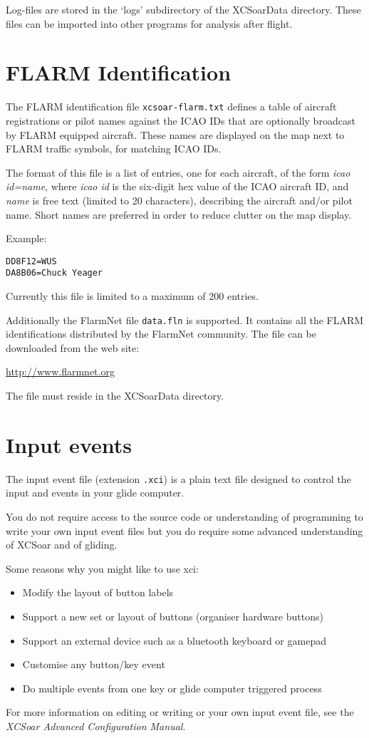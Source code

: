 Log-files are stored in the `logs' subdirectory of the XCSoarData directory.
These files can be imported into other programs for analysis after flight.

\section{FLARM Identification}\label{sec:flarm-ident-file}

The FLARM identification file \verb|xcsoar-flarm.txt| defines a table
of aircraft registrations or pilot names against the ICAO IDs that are
optionally broadcast by FLARM equipped aircraft.  These names are
displayed on the map next to FLARM traffic symbols, for matching ICAO
IDs.

The format of this file is a list of entries, one for each aircraft,
of the form {\em icao id=name}, where {\em icao id} is the six-digit
hex value of the ICAO aircraft ID, and {\em name} is free text
(limited to 20 characters), describing the aircraft and/or pilot name.
Short names are preferred in order to reduce clutter on the map
display.

Example:
\begin{verbatim}
DD8F12=WUS
DA8B06=Chuck Yeager
\end{verbatim}

Currently this file is limited to a maximum of 200 entries.

Additionally the FlarmNet file \verb|data.fln| is supported. It contains all 
the FLARM identifications distributed by the FlarmNet community. The file can 
be downloaded from the web site:

\url{http://www.flarmnet.org}

The file must reside in the XCSoarData directory.


\section{Input events}

The input event file (extension \verb|.xci|) is a plain text file
designed to control the input and events in your glide computer.

You do not require access to the source code or understanding of
programming to write your own input event files but you do require
some advanced understanding of XCSoar and of gliding.

Some reasons why you might like to use xci:
\begin{itemize}
\item Modify the layout of button labels
\item Support a new set or layout of buttons (organiser hardware buttons)
\item Support an external device such as a bluetooth keyboard or gamepad
\item Customise any button/key event
\item Do multiple events from one key or glide computer triggered process
\end{itemize}
For more information on editing or writing or your own input event
file, see the {\em XCSoar Advanced Configuration Manual}.

